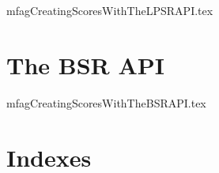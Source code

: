 \documentclass[11pt,a4paper]{report}
\begin{document}
{mfagCreatingScoresWithTheLPSRAPI.tex}


\part{The BSR API}


{mfagCreatingScoresWithTheBSRAPI.tex}



\part{Indexes}

\useListsPagesHeadersAndFooters

\printindex[Files]

\printindex[Options]

\printindex[MusicXML]

\printindex[Main]


\end{document}
